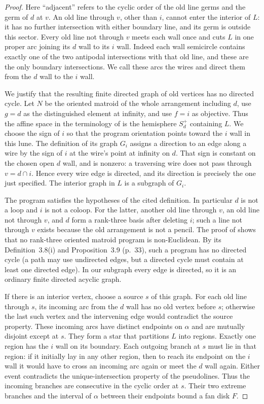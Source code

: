 \begin{proof}
Here ``adjacent'' refers to the cyclic order of the old line germs
and the germ of $d$ at $v$.  An old line through $v$, other than $i$,
cannot enter the interior of $L$: it has no further intersection
with either boundary line, and its germ is outside this sector.
Every old line not through $v$ meets each wall once and cuts $L$ in
one proper arc joining its $d$ wall to its $i$ wall.  Indeed each
wall semicircle contains exactly one of the two antipodal
intersections with that old line, and these are the only boundary
intersections.  We call these arcs the wires and direct them from
the $d$ wall to the $i$ wall.

We justify that the resulting finite directed graph of old vertices
has no directed cycle.  Let $N$ be the oriented matroid of the whole
arrangement including $d$, use $g=d$ as the distinguished element
at infinity, and use $f=i$ as objective.  Thus the affine space in
the terminology of \cite[pp.~30--31]{SZ1993} is the hemisphere
$S_d^+$ containing $L$.  We choose the sign of $i$ so that the
program orientation points toward the $i$ wall in this lune.  The
definition of its graph $G_i$ assigns a direction to an edge along
a wire by the sign of $i$ at the wire's point at infinity on $d$.
That sign is constant on the chosen open $d$ wall, and is nonzero:
a traversing wire does not pass through $v=d\cap i$.  Hence every
wire edge is directed, and its direction is precisely the one just
specified.  The interior graph in $L$ is a subgraph of $G_i$.

The program satisfies the hypotheses of the cited definition.  In
particular $d$ is not a loop and $i$ is not a coloop.  For the latter,
another old line through $v$, an old line not through $v$, and $d$
form a rank-three basis after deleting $i$; such a line not through
$v$ exists because the old arrangement is not a pencil.  The proof
of \cite[Corollary~4.5, p.~40]{SZ1993} shows that no rank-three
oriented matroid program is non-Euclidean.  By its Definition~3.8(i)
and Proposition~3.9 (p.~33), such a program has no directed cycle
(a path may use undirected edges, but a directed cycle must contain
at least one directed edge).  In our subgraph every edge is directed,
so it is an ordinary finite directed acyclic graph.

If there is an interior vertex, choose a source $s$ of this graph.
For each old line through $s$, its incoming arc from the $d$ wall
has no old vertex before $s$; otherwise the last such vertex and
the intervening edge would contradict the source property.  These
incoming arcs have distinct endpoints on $\alpha$ and are mutually
disjoint except at $s$.  They form a star that partitions $L$ into
regions.  Exactly one region has the $i$ wall on its boundary.  Each
outgoing branch at $s$ must lie in that region: if it initially lay
in any other region, then to reach its endpoint on the $i$ wall it
would have to cross an incoming arc again or meet the $d$ wall
again.  Either event contradicts the unique-intersection property
of the pseudolines.  Thus the incoming branches are consecutive in
the cyclic order at $s$.  Their two extreme branches and the
interval of $\alpha$ between their endpoints bound a fan disk $F$.


\end{proof}

